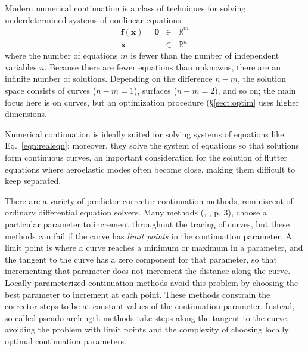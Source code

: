 \documentclass[11pt,openany,twoside]{book}
\numberwithin{equation}{section}		%
\newcommand{\Newterm}[1]{{\em #1}}	%
\newcommand{\Vector}[1]{\boldsymbol{#1}}
\newcommand{\Sectref}[1]{\S\ref{#1}}
\newcommand{\Eqn}[1]{Eq.\ \ref{#1}}  %
\begin{document}
Modern numerical continuation is a class of techniques for solving
underdetermined systems of nonlinear equations:
\begin{eqnarray}\label{eqn:fx}
\Vector{f}(\Vector{x}) = \Vector{0} & \in & \mathbb{R}^{m} \nonumber \\
\Vector{x} & \in & \mathbb{R}^{n}
\end{eqnarray}
where the number of equations $m$
is fewer than the number of independent variables $n$.
Because there are fewer equations than unknowns, there are an infinite
number of solutions.
Depending on the difference $n-m$, the solution space consists of
curves ($n-m = 1$), surfaces ($n-m = 2$), and so on; the main focus here
is on curves, but an optimization procedure (\Sectref{sect:optim}
uses higher dimensions.
\par
Numerical continuation is ideally suited for solving systems of equations
like \Eqn{eqn:realeqn}; moreover, they solve the system of equations
so that solutions form continuous curves,
an important consideration for the solution of flutter equations
where aeroelastic modes often become close, making them difficult to
keep separated.
\par
There are a variety of predictor-corrector continuation methods, 
reminiscent of ordinary differential equation solvers.
Many methods
(\cite{cardani1978continuation}, \cite{yu2020nonlinear},
\cite{allgower1990numerical} p. 3),
choose a particular parameter to increment throughout the tracing of curves,
but these methods can fail if the curve has \Newterm{limit points} in
the continuation parameter.
A limit point is where a curve reaches a minimum or maximum in a parameter,
and the tangent to the curve has a zero component for that parameter,
so that incrementing that parameter does not increment the distance along the
curve.
Locally parameterized continuation methods \cite{rheinboldt1983locally}
avoid this problem
by choosing the best parameter to increment at each point.
These methods constrain the corrector steps to be at constant values of the
continuation parameter.
Instead, so-called pseudo-arclength methods take steps along the tangent
to the curve, avoiding the problem with limit points and the complexity of
choosing locally optimal continuation parameters.
\end{document}
